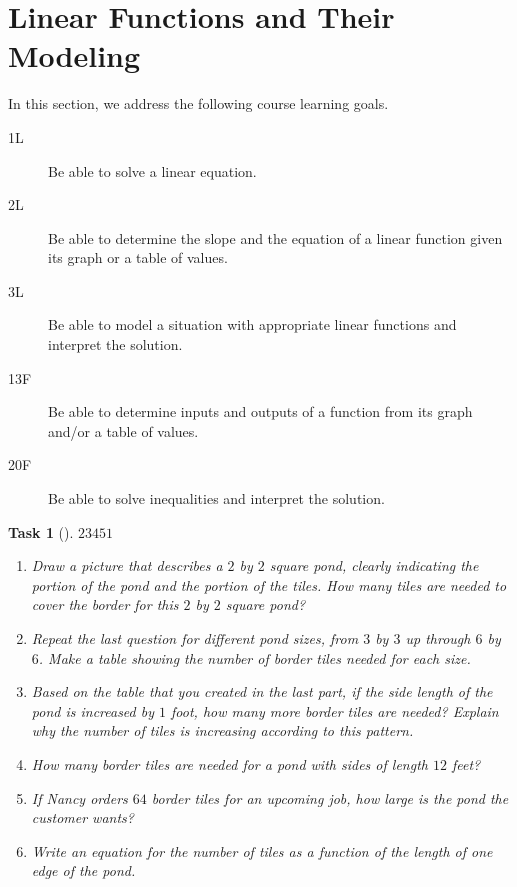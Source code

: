\documentclass[10pt,]{article}
\theoremstyle{plain}
\newtheorem{proposition}[theorem]{Task}
\theoremstyle{definition}
\numberwithin{equation}{section}
\begin{document}
\section[{Linear Functions and Their Modeling}]{Linear Functions and Their Modeling}\label{section-linear}
\hypertarget{p-32}{}%
In this section, we address the following course learning goals.%
\leavevmode%
\begin{description}
\item[{1L}]\hypertarget{li-31}{}\hypertarget{p-33}{}%
Be able to solve a linear equation.%
\item[{2L}]\hypertarget{li-32}{}\hypertarget{p-34}{}%
Be able to determine the slope and the equation of a linear function given its graph or a table of values.%
\item[{3L}]\hypertarget{li-33}{}\hypertarget{p-35}{}%
Be able to model a situation with appropriate linear functions and interpret the solution.%
\item[{13F}]\hypertarget{li-34}{}\hypertarget{p-36}{}%
Be able to determine inputs and outputs of a function from its graph and/or a table of values.%
\item[{20F}]\hypertarget{li-35}{}\hypertarget{p-37}{}%
Be able to solve inequalities and interpret the solution.%
\end{description}
\begin{proposition}[{}]\label{motivation-linear}
\(2\)\(3\)\(4\)\(5\)\(1\)\leavevmode%
\begin{enumerate}
\item\hypertarget{li-36}{}Draw a picture that describes a \(2\) by \(2\) square pond, clearly indicating the portion of the pond and the portion of the tiles. How many tiles are needed to cover the border for this \(2\) by \(2\) square pond?%
\item\hypertarget{li-37}{}Repeat the last question for different pond sizes, from \(3\) by \(3\) up through \(6\) by \(6\). Make a table showing the number of border tiles needed for each size.%
\item\hypertarget{li-38}{}Based on the table that you created in the last part, if the side length of the pond is increased by \(1\) foot, how many more border tiles are needed? Explain why the number of tiles is increasing according to this pattern.%
\item\hypertarget{li-39}{}How many border tiles are needed for a pond with sides of length \(12\) feet?%
\item\hypertarget{li-40}{}If Nancy orders \(64\) border tiles for an upcoming job, how large is the pond the customer wants?%
\item\hypertarget{li-41}{}Write an equation for the number of tiles as a function of the length of one edge of the pond.%
\end{enumerate}
\end{proposition}
\end{document}
